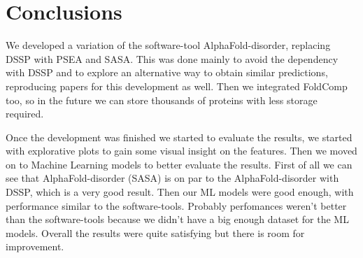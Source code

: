 \chapter{Conclusions}
\label{chp:conclusions}
We developed a variation of the software-tool AlphaFold-disorder, replacing DSSP with PSEA and SASA. This was done mainly to avoid the dependency with DSSP and to explore an alternative way to obtain similar predictions, reproducing papers for this development as well. Then we integrated FoldComp too, so in the future we can store thousands of proteins with less storage required.

Once the development was finished we started to evaluate the results, we started with explorative plots to gain some visual insight on the features. Then we moved on to Machine Learning models to better evaluate the results. First of all we can see that AlphaFold-disorder (SASA) is on par to the AlphaFold-disorder with DSSP, which is a very good result. Then our ML models were good enough, with performance similar to the software-tools. Probably perfomances weren't better than the software-tools because we didn't have a big enough dataset for the ML models. Overall the results were quite satisfying but there is room for improvement.